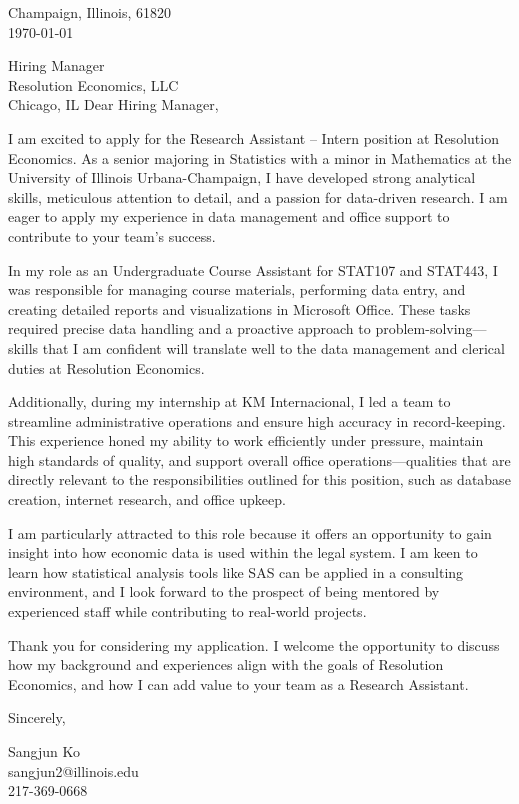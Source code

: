 \documentclass[11pt]{article}
\begin{document}
\noindent
Champaign, Illinois, 61820 \\
\today
\vspace{2em}

\noindent
Hiring Manager\\
Resolution Economics, LLC\\
Chicago, IL
\vspace{1.5em}
Dear Hiring Manager,

I am excited to apply for the Research Assistant – Intern position at Resolution Economics. As a senior majoring in Statistics with a minor in Mathematics at the University of Illinois Urbana-Champaign, I have developed strong analytical skills, meticulous attention to detail, and a passion for data-driven research. I am eager to apply my experience in data management and office support to contribute to your team’s success.

In my role as an Undergraduate Course Assistant for STAT107 and STAT443, I was responsible for managing course materials, performing data entry, and creating detailed reports and visualizations in Microsoft Office. These tasks required precise data handling and a proactive approach to problem-solving—skills that I am confident will translate well to the data management and clerical duties at Resolution Economics.

Additionally, during my internship at KM Internacional, I led a team to streamline administrative operations and ensure high accuracy in record-keeping. This experience honed my ability to work efficiently under pressure, maintain high standards of quality, and support overall office operations—qualities that are directly relevant to the responsibilities outlined for this position, such as database creation, internet research, and office upkeep.

I am particularly attracted to this role because it offers an opportunity to gain insight into how economic data is used within the legal system. I am keen to learn how statistical analysis tools like SAS can be applied in a consulting environment, and I look forward to the prospect of being mentored by experienced staff while contributing to real-world projects.

Thank you for considering my application. I welcome the opportunity to discuss how my background and experiences align with the goals of Resolution Economics, and how I can add value to your team as a Research Assistant.
\vspace{1em}

Sincerely,

\vspace{2em}

\noindent
Sangjun Ko\\
sangjun2@illinois.edu\\
217-369-0668
\end{document}
